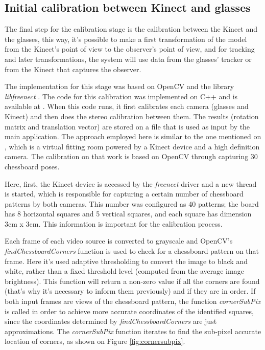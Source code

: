 \documentclass[msc, a4paper, classic, en]{ufbathesis}
\begin{document}
\subsection{Initial calibration between Kinect and glasses}

The final step for the calibration stage is the calibration between the Kinect and the glasses, this way, it's possible to make a first transformation of the model from the Kinect's point of view to the observer's point of view, and for tracking and later transformations, the system will use data from the glasses' tracker or from the Kinect that captures the observer.

The implementation for this stage was based on OpenCV \cite{opencv} and the library \textit{libfreenect} \cite{openkinect}. The code for this calibration was implemented on C++ and is available at \cite{masterproject}. When this code runs, it first calibrates each camera (glasses and Kinect) and then does the stereo calibration between them. The results (rotation matrix and translation vector) are stored on a file that is used as input by the main application. The approach employed here is similar to the one mentioned on \cite{tryon}, which is a virtual fitting room powered by a Kinect device and a high definition camera. The calibration on that work is based on OpenCV through capturing 30 chessboard poses.

Here, first, the Kinect device is accessed by the \textit{freenect} driver and a new thread is started, which is responsible for capturing a certain number of chessboard patterns by both cameras. This number was configured as 40 patterns; the board has 8 horizontal squares and 5 vertical squares, and each square has dimension 3cm x 3cm. This information is important for the calibration process.

Each frame of each video source is converted to grayscale and OpenCV's \textit{findChessboardCorners} function is used to check for a chessboard pattern on that frame. Here it's used adaptive thresholding to convert the image to black and white, rather than a fixed threshold level (computed from the average image brightness). This function will return a non-zero value if all the corners are found (that's why it's necessary to inform them previously) and if they are in order. If both input frames are views of the chessboard pattern, the function \textit{cornerSubPix} is called in order to achieve more accurate coordinates of the identified squares, since the coordinates determined by \textit{findChessboardCorners} are just approximations. The \textit{cornerSubPix} function iterates to find the sub-pixel accurate location of corners, as shown on Figure \ref{fig:cornersubpix}.
\end{document}
